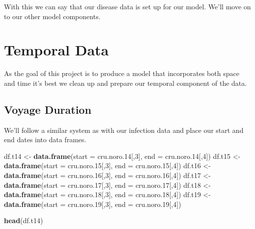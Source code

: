 \documentclass[
  11,
]{book}
\newenvironment{Shaded}{\begin{snugshade}}{\end{snugshade}}
\newcommand{\AttributeTok}[1]{\textcolor[rgb]{0.27,0.27,0.27}{#1}}
\newcommand{\DecValTok}[1]{\textcolor[rgb]{0.06,0.06,0.06}{#1}}
\newcommand{\FloatTok}[1]{\textcolor[rgb]{0.06,0.06,0.06}{#1}}
\newcommand{\FunctionTok}[1]{\textcolor[rgb]{0.27,0.27,0.27}{\textbf{#1}}}
\newcommand{\NormalTok}[1]{#1}
\newcommand{\OtherTok}[1]{\textcolor[rgb]{0.37,0.37,0.37}{#1}}
\begin{document}
With this we can say that our disease data is set up for our model. We'll move on to our other model components.

\hypertarget{temporal-data}{%
\section*{Temporal Data}\label{temporal-data}}


As the goal of this project is to produce a model that incorporates both space and time it's best we clean up and prepare our temporal component of the data.

\hypertarget{voyage-duration}{%
\subsection*{Voyage Duration}\label{voyage-duration}}


We'll follow a similar system as with our infection data and place our start and end dates into data frames.

\begin{Shaded}
\begin{Highlighting}[]
\NormalTok{df.t14 }\OtherTok{\textless{}{-}} \FunctionTok{data.frame}\NormalTok{(}\AttributeTok{start =}\NormalTok{ cru.noro}\FloatTok{.14}\NormalTok{[,}\DecValTok{3}\NormalTok{],}
                   \AttributeTok{end =}\NormalTok{ cru.noro}\FloatTok{.14}\NormalTok{[,}\DecValTok{4}\NormalTok{])}
\NormalTok{df.t15 }\OtherTok{\textless{}{-}} \FunctionTok{data.frame}\NormalTok{(}\AttributeTok{start =}\NormalTok{ cru.noro}\FloatTok{.15}\NormalTok{[,}\DecValTok{3}\NormalTok{],}
                     \AttributeTok{end =}\NormalTok{ cru.noro}\FloatTok{.15}\NormalTok{[,}\DecValTok{4}\NormalTok{])}
\NormalTok{df.t16 }\OtherTok{\textless{}{-}} \FunctionTok{data.frame}\NormalTok{(}\AttributeTok{start =}\NormalTok{ cru.noro}\FloatTok{.16}\NormalTok{[,}\DecValTok{3}\NormalTok{],}
                     \AttributeTok{end =}\NormalTok{ cru.noro}\FloatTok{.16}\NormalTok{[,}\DecValTok{4}\NormalTok{])}
\NormalTok{df.t17 }\OtherTok{\textless{}{-}} \FunctionTok{data.frame}\NormalTok{(}\AttributeTok{start =}\NormalTok{ cru.noro}\FloatTok{.17}\NormalTok{[,}\DecValTok{3}\NormalTok{],}
                     \AttributeTok{end =}\NormalTok{ cru.noro}\FloatTok{.17}\NormalTok{[,}\DecValTok{4}\NormalTok{])}
\NormalTok{df.t18 }\OtherTok{\textless{}{-}} \FunctionTok{data.frame}\NormalTok{(}\AttributeTok{start =}\NormalTok{ cru.noro}\FloatTok{.18}\NormalTok{[,}\DecValTok{3}\NormalTok{],}
                     \AttributeTok{end =}\NormalTok{ cru.noro}\FloatTok{.18}\NormalTok{[,}\DecValTok{4}\NormalTok{])}
\NormalTok{df.t19 }\OtherTok{\textless{}{-}} \FunctionTok{data.frame}\NormalTok{(}\AttributeTok{start =}\NormalTok{ cru.noro}\FloatTok{.19}\NormalTok{[,}\DecValTok{3}\NormalTok{],}
                     \AttributeTok{end =}\NormalTok{ cru.noro}\FloatTok{.19}\NormalTok{[,}\DecValTok{4}\NormalTok{])}

\FunctionTok{head}\NormalTok{(df.t14)}
\end{Highlighting}
\end{Shaded}
\end{document}
